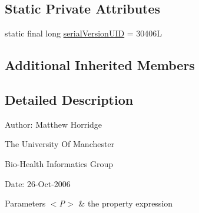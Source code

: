 \subsection*{Static Private Attributes}
\begin{DoxyCompactItemize}
\item 
static final long \hyperlink{classuk_1_1ac_1_1manchester_1_1cs_1_1owl_1_1owlapi_1_1_o_w_l_nary_property_axiom_impl_3_01_p_01ebb131bf5bfcb769e964dbdcf75a7ae4d_a34bc37f2401f184591867340967471f9}{serial\-Version\-U\-I\-D} = 30406\-L
\end{DoxyCompactItemize}
\subsection*{Additional Inherited Members}


\subsection{Detailed Description}
Author\-: Matthew Horridge\par
 The University Of Manchester\par
 Bio-\/\-Health Informatics Group\par
 Date\-: 26-\/\-Oct-\/2006\par
\par
 
\begin{DoxyParams}{Parameters}
{\em $<$\-P$>$} & the property expression \\
\hline
\end{DoxyParams}


